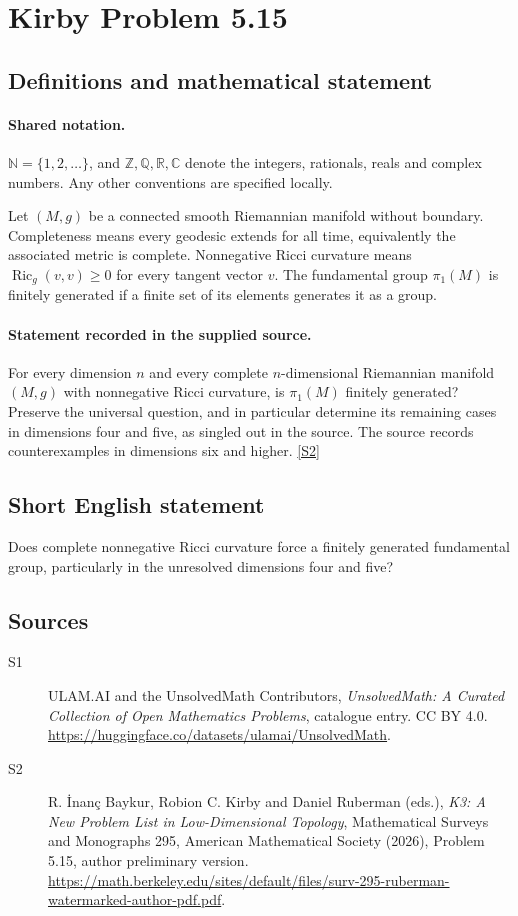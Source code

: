 \documentclass[11pt]{article}
\newcommand{\sref}[2]{\hyperlink{source:#1:#2}{[S#2]}}
\begin{document}
\section{Kirby Problem 5.15}\label{statement}

\subsection{Definitions and mathematical statement}

\paragraph{Shared notation.}$\mathbb N=\{1,2,\ldots\}$, and $\mathbb Z,\mathbb Q,\mathbb R,\mathbb C$ denote the integers, rationals, reals and complex numbers. Any other conventions are specified locally.


Let $(M,g)$ be a connected smooth Riemannian manifold without boundary. Completeness means every geodesic extends for all time, equivalently the associated metric is complete. Nonnegative Ricci curvature means $\operatorname{Ric}_g(v,v)\geq0$ for every tangent vector $v$. The fundamental group $\pi_1(M)$ is finitely generated if a finite set of its elements generates it as a group.
\paragraph{Statement recorded in the supplied source.}
For every dimension $n$ and every complete $n$-dimensional Riemannian manifold $(M,g)$ with nonnegative Ricci curvature, is $\pi_1(M)$ finitely generated? Preserve the universal question, and in particular determine its remaining cases in dimensions four and five, as singled out in the source. The source records counterexamples in dimensions six and higher. \sref{statement}{2}
\subsection{Short English statement}
Does complete nonnegative Ricci curvature force a finitely generated fundamental group, particularly in the unresolved dimensions four and five?
\subsection{Sources}
\begin{description}
\item[\hypertarget{source:statement:1}{S1}] ULAM.AI and the UnsolvedMath Contributors, \emph{UnsolvedMath: A Curated Collection of Open Mathematics Problems}, catalogue entry. CC BY 4.0. \url{https://huggingface.co/datasets/ulamai/UnsolvedMath}.
\item[\hypertarget{source:statement:2}{S2}] R. İnanç Baykur, Robion C. Kirby and Daniel Ruberman (eds.), \emph{K3: A New Problem List in Low-Dimensional Topology}, Mathematical Surveys and Monographs 295, American Mathematical Society (2026), Problem 5.15, author preliminary version. \url{https://math.berkeley.edu/sites/default/files/surv-295-ruberman-watermarked-author-pdf.pdf}.
\end{description}
\label{end:statement}
\end{document}
